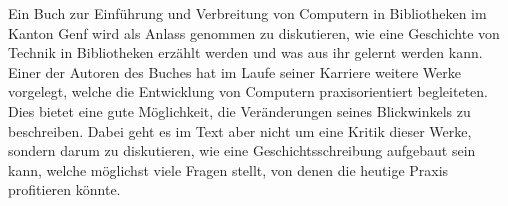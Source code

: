 Ein Buch zur Einführung und Verbreitung von Computern in Bibliotheken im Kanton Genf wird als Anlass genommen zu diskutieren, wie eine Geschichte von Technik in Bibliotheken erzählt werden und was aus ihr gelernt werden kann. Einer der Autoren des Buches hat im Laufe seiner Karriere weitere Werke vorgelegt, welche die Entwicklung von Computern praxisorientiert begleiteten. Dies bietet eine gute Möglichkeit, die Veränderungen seines Blickwinkels zu beschreiben. Dabei geht es im Text aber nicht um eine Kritik dieser Werke, sondern darum zu diskutieren, wie eine Geschichtsschreibung aufgebaut sein kann, welche möglichst viele Fragen stellt, von denen die heutige Praxis profitieren könnte.
